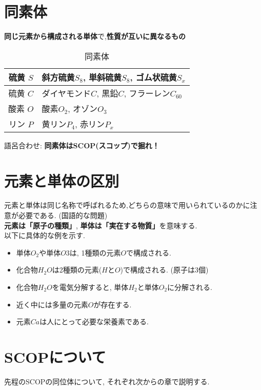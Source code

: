 \section{同素体}{
	{\bf 同じ元素から構成される単体}で,{\bf 性質が互いに異なるもの} \\

	\begin{table}[htp]
		\caption{同素体}
			\begin{center}
				\begin{tabular}{|c||l|}
					\hline
					硫黄 $S$ & 斜方硫黄$S_8$, 単斜硫黄$S_8$, ゴム状硫黄$S_x$ \\ \hline
					硫黄 $C$ & ダイヤモンド$C$, 黒鉛$C$, フラーレン$C_{60}$ \\ \hline
					酸素 $O$ & 酸素$O_2$, オゾン$O_3$ \\ \hline
					リン $P$ & 黄リン$P_4$, 赤リン$P_x$ \\ \hline
				\end{tabular}
			\end{center}
		\label{default}
	\end{table}%

	語呂合わせ: {\bf 同素体はSCOP(スコップ)で掘れ！}
}


\section{元素と単体の区別}{
	元素と単体は同じ名称で呼ばれるため,どちらの意味で用いられているのかに注意が必要である. (国語的な問題) \\
	{\bf 元素は「原子の種類」}, {\bf 単体は「実在する物質」}を意味する. \\
	以下に具体的な例を示す.
	\\

	\begin{itemize}
		\item 単体$O_2$や単体$O3$は, 1種類の元素$O$で構成される. \\
		\item 化合物$H_2O$は2種類の元素($H$と$O$)で構成される. (原子は$3$個) \\
		\item 化合物$H_2O$を電気分解すると, 単体$H_2$と単体$O_2$に分解される. \\
		\item 近く中には多量の元素$O$が存在する. \\
		\item 元素$Ca$は人にとって必要な栄養素である.
	\end{itemize}
}

\section{SCOPについて}{
	先程のSCOPの同位体について, それぞれ次からの章で説明する.
	
}
